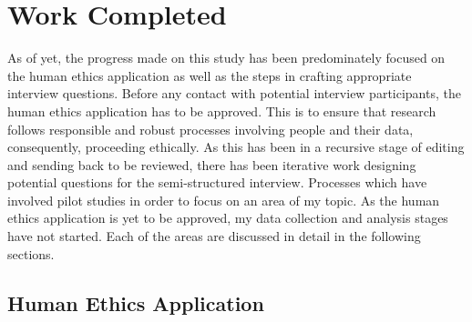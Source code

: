 \chapter{Work Completed}\label{C:Completed}

\par As of yet, the progress made on this study has been predominately focused on the human ethics application as well as the steps in crafting appropriate interview questions. Before any contact with potential interview participants, the human ethics application has to be approved. This is to ensure that research follows responsible and robust processes involving people and their data, consequently, proceeding ethically. As this has been in a recursive stage of editing and sending back to be reviewed, there has been iterative work designing potential questions for the semi-structured interview. Processes which have involved pilot studies in order to focus on an area of my topic. As the human ethics application is yet to be approved, my data collection and analysis stages have not started. Each of the areas are discussed in detail in the following sections. 

\section{Human Ethics Application}

